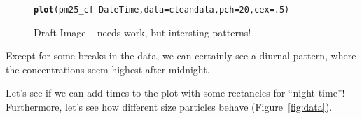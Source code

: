\documentclass{article}\usepackage[]{graphicx}\usepackage[]{xcolor}
\makeatletter
\newcommand{\hlnum}[1]{\textcolor[rgb]{0.686,0.059,0.569}{#1}}%
\newcommand{\hlopt}[1]{\textcolor[rgb]{0,0,0}{#1}}%
\newcommand{\hlstd}[1]{\textcolor[rgb]{0.345,0.345,0.345}{#1}}%
\newcommand{\hlkwc}[1]{\textcolor[rgb]{0.333,0.667,0.333}{#1}}%
\newcommand{\hlkwd}[1]{\textcolor[rgb]{0.737,0.353,0.396}{\textbf{#1}}}%
\newenvironment{kframe}{%
 \def\at@end@of@kframe{}%
 \ifinner\ifhmode%
  \def\at@end@of@kframe{\end{minipage}}%
  \begin{minipage}{\columnwidth}%
 \fi\fi%
 \def\FrameCommand##1{\hskip\@totalleftmargin \hskip-\fboxsep
 \colorbox{shadecolor}{##1}\hskip-\fboxsep
     \hskip-\linewidth \hskip-\@totalleftmargin \hskip\columnwidth}%
 \MakeFramed {\advance\hsize-\width
   \@totalleftmargin\z@ \linewidth\hsize
   \@setminipage}}%
 {\par\unskip\endMakeFramed%
 \at@end@of@kframe}
\newenvironment{knitrout}{}{} %
\makeatother
\begin{document}
\begin{figure}
\begin{knitrout}
\color{fgcolor}\begin{kframe}
\begin{alltt}
\hlkwd{plot}\hlstd{(pm25_cf}\hlopt{~}\hlstd{DateTime,} \hlkwc{data}\hlstd{=cleandata,} \hlkwc{pch}\hlstd{=}\hlnum{20}\hlstd{,} \hlkwc{cex}\hlstd{=}\hlnum{.5}\hlstd{)}
\end{alltt}


{\ttfamily\noindent\bfseries\color{errorcolor}{\#\# Error in eval(m\$data, eframe): object 'cleandata' not found}}\end{kframe}
\end{knitrout}
\caption{Draft Image -- needs work, but intersting patterns!}
\label{fig:draft}
\end{figure}
Except for some breaks in the data, we can certainly see a diurnal pattern, where the concentrations seem highest after midnight. 

Let's see if we can add times to the plot with some rectancles for ``night time''!  Furthermore, let's see how different size particles behave (Figure~\ref{fig:data}). 
\end{document}
